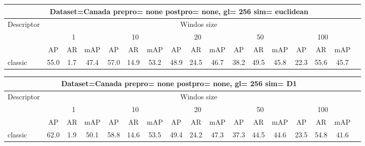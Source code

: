 \documentclass[12pt,italian]{article}
\begin{document}
\small
\begin{longtable}{lcccccccccccccccc}
\toprule
\multicolumn{16}{c}{Dataset=Canada prepro= none postpro= none, gl= 256 sim= euclidean} \\ 
\toprule
Descriptor & \multicolumn{15}{c}{Windos size} \\ 
& \multicolumn{3}{c}{1} & \multicolumn{3}{c}{10} & \multicolumn{3}{c}{20} & \multicolumn{3}{c}{50} & \multicolumn{3}{c}{100} \\ 
& AP & AR & mAP & AP & AR & mAP & AP & AR & mAP & AP & AR & mAP & AP & AR & mAP \\ 
\midrule
classic & 55.0 &  1.7 & 47.4 & 57.0 & 14.9 & 53.2 & 48.9 & 24.5 & 46.7 & 38.2 & 49.5 & 45.8 & 22.3 & 55.6 & 45.7 \\ 
\bottomrule
\end{longtable} 

 \pagebreak 
\begin{longtable}{lcccccccccccccccc}
\toprule
\multicolumn{16}{c}{Dataset=Canada prepro= none postpro= none, gl= 256 sim= D1} \\ 
\toprule
Descriptor & \multicolumn{15}{c}{Windos size} \\ 
& \multicolumn{3}{c}{1} & \multicolumn{3}{c}{10} & \multicolumn{3}{c}{20} & \multicolumn{3}{c}{50} & \multicolumn{3}{c}{100} \\ 
& AP & AR & mAP & AP & AR & mAP & AP & AR & mAP & AP & AR & mAP & AP & AR & mAP \\ 
\midrule
classic & 62.0 &  1.9 & 50.1 & 58.8 & 14.6 & 53.5 & 49.4 & 24.2 & 47.3 & 37.3 & 44.5 & 44.6 & 23.5 & 54.8 & 41.6 \\ 
\bottomrule
\end{longtable} 

 \pagebreak 
\end{document}
